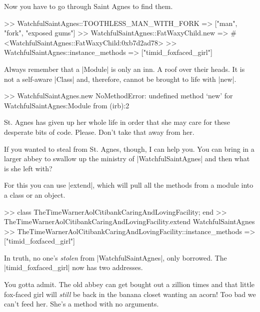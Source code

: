 \documentclass[12pt,twoside]{report}
\begin{document}
Now you have to go through Saint Agnes to find them.


\begin{consolecode}

 >> WatchfulSaintAgnes::TOOTHLESS_MAN_WITH_FORK
 => ["man", "fork", "exposed gums"]
 >> WatchfulSaintAgnes::FatWaxyChild.new
 => #<WatchfulSaintAgnes::FatWaxyChild:0xb7d2ad78>
 >> WatchfulSaintAgnes::instance_methods
 => ["timid_foxfaced_girl"]

\end{consolecode}


Always remember that a \rubyinline|Module| is only an
inn.  A roof over their heads.  It is not a self-aware
\rubyinline|Class| and, therefore, cannot be brought
to life with \rubyinline|new|.


\begin{consolecode}

 >> WatchfulSaintAgnes.new
 NoMethodError: undefined method `new' for WatchfulSaintAgnes:Module
         from (irb):2

\end{consolecode}


St. Agnes has given up her whole life in order that she may care for
these desperate bits of code. Please.  Don't take that away from her.

If you wanted to steal from St. Agnes, though, I can help you. You can
bring in a larger abbey to swallow up the ministry of
\rubyinline|WatchfulSaintAgnes| and then what is she
left with?

For this you can use \rubyinline|extend|, which will
pull all the methods from a module into a class or an object.


\begin{consolecode}

 >> class TheTimeWarnerAolCitibankCaringAndLovingFacility; end
 >> TheTimeWarnerAolCitibankCaringAndLovingFacility.extend WatchfulSaintAgnes
 >> TheTimeWarnerAolCitibankCaringAndLovingFacility::instance_methods
 => ["timid_foxfaced_girl"]

\end{consolecode}


In truth, no one's {\em stolen} from
\rubyinline|WatchfulSaintAgnes|, only borrowed.  The
\rubyinline|timid_foxfaced_girl| now has two
addresses.

You gotta admit.  The old abbey can get bought out a zillion times and
that little fox-faced girl will {\em still} be back in the banana
closet wanting an acorn!  Too bad we can't feed her. She's a method
with no arguments.
\end{document}
